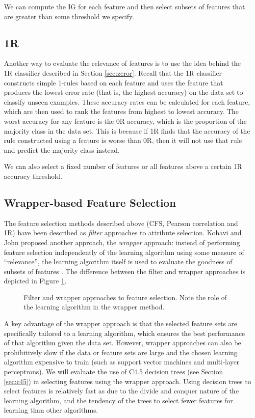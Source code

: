 We can compute the IG for each feature and then select subsets of features that
are greater than some threshold we specify.

\subsection{1R}
Another way to evaluate the relevance of features is to use the idea behind the
1R classifier described in Section \ref{sec:zeror}. Recall that the 1R
classifier constructs simple 1-rules based on each feature and uses the feature
that produces the lowest error rate (that is, the highest accuracy) on the data
set to classify unseen examples. These accuracy rates can be calculated for
each feature, which are then used to rank the features from highest to lowest
accuracy. The worst accuracy for any feature is the 0R accuracy, which is the
proportion of the majority class in the data set. This is because if 1R finds
that the accuracy of the rule constructed using a feature is worse than 0R,
then it will not use that rule and predict the majority class instead.

We can also select a fixed number of features or all features above a certain
1R accuracy threshold.

\subsection{Wrapper-based Feature Selection}
The feature selection methods described above (CFS, Pearson correlation and
1R) have been described as \textit{filter} approaches to attribute selection.
Kohavi and John proposed another approach, the \textit{wrapper} approach:
instead of performing feature selection independently of the learning
algorithm using some measure of ``relevance'',
the learning algorithm itself is used to evaluate the goodness of
subsets of features \cite{Kohavi1997}. The difference between the filter
and wrapper approaches is depicted in Figure \ref{fig:wrapper}.

\begin{figure}[h]
\caption{Filter and wrapper approaches to feature selection. Note the role of
the learning algorithm in the wrapper method.}
\label{fig:wrapper}
\centering
\end{figure}

A key advantage of the wrapper approach is that the selected feature sets are
specifically tailored to a learning algorithm, which ensures the best
performance of that algorithm given the data set. However, wrapper approaches
can also be prohibitively slow if the data or feature sets are large and the
chosen learning algorithm expensive to train (such as support vector machines
and multi-layer perceptrons). We will evaluate the use of C4.5 decision trees
(see Section \ref{sec:c45}) in selecting features using the wrapper approach.
Using decision trees to select features is relatively fast as due to the
divide and conquer nature of the learning algorithm, and the tendency of the
trees to select fewer features for learning than other algorithms.


